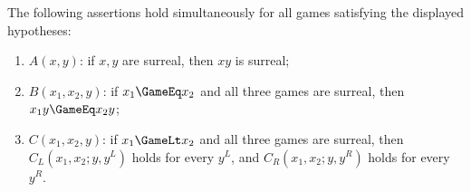 \begin{theorem}
  \label{thm:abc-main}
  \leanok
  The following assertions hold simultaneously for all games satisfying the
  displayed hypotheses:
  \begin{enumerate}
    \item \(A(x,y)\): if \(x,y\) are surreal, then \(xy\) is surreal;
    \item \(B(x_1,x_2,y)\): if \(x_1\GameEq x_2\) and all three games are surreal, then
      \(x_1y\GameEq x_2y\);
    \item \(C(x_1,x_2,y)\): if \(x_1\GameLt x_2\) and all three games are surreal, then
      \(C_L(x_1,x_2;y,y^L)\) holds for every \(y^L\), and
      \(C_R(x_1,x_2;y,y^R)\) holds for every \(y^R\).
  \end{enumerate}
\end{theorem}

